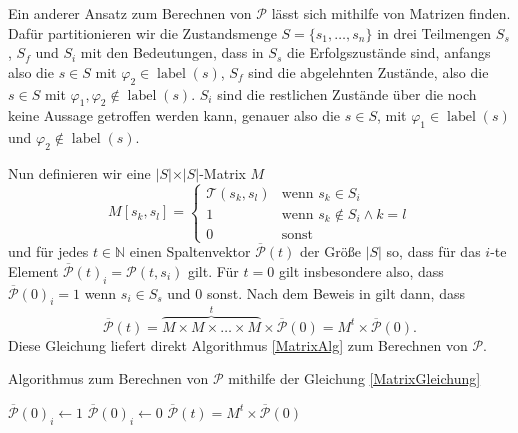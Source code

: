 Ein anderer Ansatz zum Berechnen von $\mathcal{P}$ lässt sich mithilfe von Matrizen finden. 
Dafür partitionieren wir die Zustandsmenge $S=\{s_1,\dots,s_n\}$ in drei Teilmengen $S_s$, $S_f$ und $S_i$ mit den Bedeutungen, dass in $S_s$ die Erfolgszustände sind, anfangs also die $s\in S$ mit $\varphi_2\in \operatorname{label}(s)$, $S_f$ sind die abgelehnten Zustände, also die $s\in S$ mit $\varphi_1,\varphi_2 \notin \operatorname{label}(s)$. 
$S_i$ sind die restlichen Zustände über die noch keine Aussage getroffen werden kann, genauer also die $s\in S$, mit $\varphi_1\in \operatorname{label}(s)$ und $\varphi_2\notin \operatorname{label}(s)$. \cite{hansson1994logic}

Nun definieren wir eine $\vert S \vert \times \vert S \vert$-Matrix $M$
$$M[s_k,s_l] = \begin{cases}
	\mathcal{T}(s_k,s_l) & \text{wenn } s_k\in S_i \\
	1 & \text{wenn } s_k\notin S_i \land k=l \\
	0 & \text{sonst}
\end{cases}$$
und für jedes $t\in \mathbb{N}$ einen Spaltenvektor $\overline{\mathcal{P}}(t)$ der Größe $\vert S \vert$ so, dass für das $i$-te Element $\overline{\mathcal{P}}(t)_i=\mathcal{P}(t,s_i)$ gilt. 
Für $t=0$ gilt insbesondere also, dass $\overline{\mathcal{P}}(0)_i=1$ wenn $s_i\in S_s$ und $0$ sonst.
Nach dem Beweis in \cite{hansson1994logic} gilt dann, dass 
\begin{equation}
	\overline{\mathcal{P}}(t)=\overbrace{M \times M \times \dots \times M}^t \times \overline{\mathcal{P}}(0) = M^t\times \overline{\mathcal{P}}(0).
	\label{MatrixGleichung}
\end{equation}
Diese Gleichung liefert direkt Algorithmus \ref{MatrixAlg} zum Berechnen von $\mathcal{P}$. \cite{hansson1994logic}

\begin{algorithm}[h]
	\caption{Algorithmus zum Berechnen von $\mathcal{P}$ mithilfe der Gleichung \ref{MatrixGleichung} \cite{hansson1994logic}}
	\label{MatrixAlg}
	
	\begin{algorithmic}
		\State $\overline{\mathcal{P}}(0)_i \gets 1$
		\Else
		\State $\overline{\mathcal{P}}(0)_i \gets 0$
		\EndIf
		\EndFor
		\State $\overline{\mathcal{P}}(t)=M^t\times \overline{\mathcal{P}}(0)$
	\end{algorithmic}
\end{algorithm}

